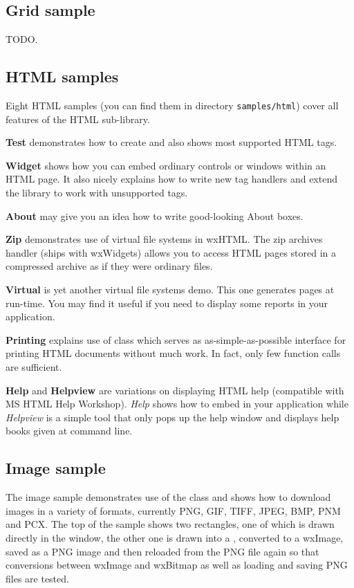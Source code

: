 \subsection{Grid sample}\label{samplegrid}

TODO.


\subsection{HTML samples}\label{samplehtml}

Eight HTML samples (you can find them in directory {\tt samples/html})
cover all features of the HTML sub-library.

{\bf Test} demonstrates how to create 
and also shows most supported HTML tags.

{\bf Widget} shows how you can embed ordinary controls or windows within an
HTML page. It also nicely explains how to write new tag handlers and extend
the library to work with unsupported tags.

{\bf About} may give you an idea how to write good-looking About boxes.

{\bf Zip} demonstrates use of virtual file systems in wxHTML. The zip archives
handler (ships with wxWidgets) allows you to access HTML pages stored
in a compressed archive as if they were ordinary files.

{\bf Virtual} is yet another virtual file systems demo. This one generates pages at run-time.
You may find it useful if you need to display some reports in your application.

{\bf Printing} explains use of 
class which serves as as-simple-as-possible interface for printing HTML
documents without much work. In fact, only few function calls are sufficient.

{\bf Help} and {\bf Helpview} are variations on displaying HTML help
(compatible with MS HTML Help Workshop). {\it Help} shows how to embed
 in your application
while {\it Helpview} is a simple tool that only pops up the help window and
displays help books given at command line.


\subsection{Image sample}\label{sampleimage}

The image sample demonstrates use of the  class
and shows how to download images in a variety of formats, currently PNG, GIF,
TIFF, JPEG, BMP, PNM and PCX. The top of the sample shows two rectangles, one
of which is drawn directly in the window, the other one is drawn into a
, converted to a wxImage, saved as a PNG image
and then reloaded from the PNG file again so that conversions between wxImage
and wxBitmap as well as loading and saving PNG files are tested.

